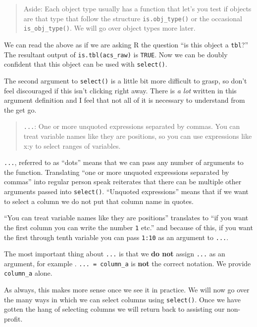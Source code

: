 \documentclass[
]{book}
\begin{document}
\begin{quote}
Aside: Each object type usually has a function that let's you test if objects are that type that follow the structure \texttt{is.obj\_type()} or the occasional \texttt{is\_obj\_type()}. We will go over object types more later.
\end{quote}

We can read the above as if we are asking R the question ``is this object a \texttt{tbl}?'' The resultant output of \texttt{is.tbl(acs\_raw)} is \texttt{TRUE}. Now we can be doubly confident that this object can be used with \texttt{select()}.

The second argument to \texttt{select()} is a little bit more difficult to grasp, so don't feel discouraged if this isn't clicking right away. There is \emph{a lot} written in this argument definition and I feel that not all of it is necessary to understand from the get go.

\begin{quote}
\texttt{...}: One or more unquoted expressions separated by commas. You can treat variable names like they are positions, so you can use expressions like x:y to select ranges of variables.
\end{quote}

\texttt{...}, referred to as ``dots'' means that we can pass any number of arguments to the function. Translating ``one or more unquoted expressions separated by commas'' into regular person speak reiterates that there can be multiple other arguments passed into \texttt{select()}. ``Unquoted expressions'' means that if we want to select a column we do not put that column name in quotes.

``You can treat variable names like they are positions'' translates to ``if you want the first column you can write the number \texttt{1} etc.'' and because of this, if you want the first through tenth variable you can pass \texttt{1:10} as an argument to \texttt{...}.

The most important thing about \texttt{...} is that we \textbf{do not} assign \texttt{...} as an argument, for example . \texttt{...\ =\ column\_a} is \textbf{not} the correct notation. We provide \texttt{column\_a} alone.

As always, this makes more sense once we see it in practice. We will now go over the many ways in which we can select columns using \texttt{select()}. Once we have gotten the hang of selecting columns we will return back to assisting our non-profit.
\end{document}
